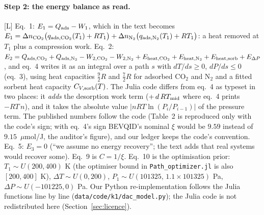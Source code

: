 \documentclass[10pt]{article}
\newcommand{\tier}[1]{\textsf{[#1]}}
\newcommand{\tL}{\tier{L}}
\newcommand{\umolJ}{\ensuremath{\mu}mol/J}
\begin{document}
\paragraph{Step 2: the energy balance as read.}\tL{} Eq.~1: $E_1=Q_{\rm ads}-W_1$, which in the text becomes
$E_1=\Delta n_{\rm CO_2}\bigl(q_{\rm ads,CO_2}(T_1)+RT_1\bigr)+\Delta n_{\rm N_2}\bigl(q_{\rm ads,N_2}(T_1)+RT_1\bigr)$: a heat removed at $T_1$ plus a compression work.
Eq.~2: $E_2=Q_{\rm ads,CO_2}+Q_{\rm ads,N_2}-W_{2,{\rm CO_2}}-W_{2,{\rm N_2}}+E_{\rm heat,CO_2}+E_{\rm heat,N_2}+E_{\rm heat,sorb}+E_{\Delta P}$, and eq.~4 writes it as an integral over a path $s$ with
$dT/ds\ge0$, $dP/ds\le0$ (eq.~3), using heat capacities $\tfrac92R$ and $\tfrac72R$ for adsorbed CO$_2$ and N$_2$ and a fitted sorbent heat capacity $C_{V,{\rm sorb}}(T)$.
The Julia code differs from eq.~4 as typeset in two places: it \emph{adds} the desorption work term ($+\,d\,RT_{\rm mid}$ where eq.~4 prints $-RT\,n$), and it takes the absolute value
$\lvert nRT\ln(P_i/P_{i-1})\rvert$ of the pressure term. The published numbers follow the code (Table~2 is reproduced only with the code's sign; with eq.~4's sign BEVQID's nominal $\xi$ would be $9.59$ instead of $9.15$~\umolJ{}, the auditor's figure),
and our ledger keeps the code's convention. Eq.~5: $E_3=0$ (``we assume no energy recovery''; the text adds that real systems would recover some). Eq.~9 is $C=1/\xi$.
Eq.~10 is the optimisation prior: $T_1\sim U(200,400)$ K (the optimiser bound in \texttt{Path\_optimizer.jl} is also $[200,400]$ K), $\Delta T\sim U(0,200)$, $P_1\sim U(101325,\,1.1\times101325)$ Pa, $\Delta P\sim U(-101225,0)$ Pa. Our Python
re-implementation follows the Julia functions line by line (\texttt{data/code/k1/dac\_model.py}); the Julia code is not redistributed here (Section~\ref{sec:licence}).
\end{document}
